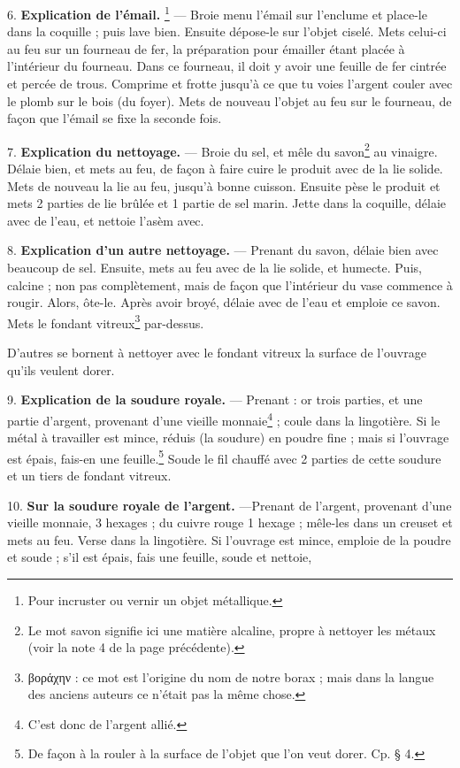\documentclass[a4paper, 11pt, oneside, polutonikogreek, french]{article}
\begin{document}
6. \textbf{Explication de l'émail.} \footnote{Pour incruster ou vernir un objet métallique.} --- Broie menu l'émail sur l'enclume et place-le dans la coquille ; puis lave bien. Ensuite dépose-le sur l'objet ciselé. Mets celui-ci au feu sur un fourneau de fer, la préparation pour émailler étant placée à l'intérieur du fourneau. Dans ce fourneau, il doit y avoir une feuille de fer cintrée et percée de trous. Comprime et frotte jusqu'à ce que tu voies l'argent couler avec le plomb sur le bois (du foyer). Mets de nouveau l'objet au feu sur le fourneau, de façon que l'émail se fixe la seconde fois.

7. \textbf{Explication du nettoyage.} --- Broie du sel, et mêle du savon\footnote{Le mot savon signifie ici une matière alcaline, propre à nettoyer les métaux (voir la note 4 de la page précédente).} au vinaigre. Délaie bien, et mets au feu, de façon à faire cuire le produit avec de la lie solide. Mets de nouveau la lie au feu, jusqu'à bonne cuisson. Ensuite pèse le produit et mets 2 parties de lie brûlée et 1 partie de sel marin. Jette dans la coquille, délaie avec de l'eau, et nettoie l'asèm avec.

8. \textbf{Explication d'un autre nettoyage.} --- Prenant du savon, délaie bien avec beaucoup de sel. Ensuite, mets au feu avec de la lie solide, et humecte. Puis, calcine ; non pas complètement, mais de façon que l'intérieur du vase commence à rougir. Alors, ôte-le. Après avoir broyé, délaie avec de l'eau et emploie ce savon. Mets le fondant vitreux\footnote{βοράχην : ce mot est l'origine du nom de notre borax ; mais dans la langue des anciens auteurs ce n'était pas la même chose.} par-dessus.

D'autres se bornent à nettoyer avec le fondant vitreux la surface de l'ouvrage qu'ils veulent dorer.

9. \textbf{Explication de la soudure royale.} --- Prenant : or trois parties, et une partie d'argent, provenant d'une vieille monnaie\footnote{C'est donc de l'argent allié.} ; coule dans la lingotière. Si le métal à travailler est mince, réduis (la soudure) en poudre fine ; mais si l'ouvrage est épais, fais-en une feuille.\footnote{De façon à la rouler à la surface de l'objet que l'on veut dorer. Cp. § 4.} Soude le fil chauffé avec 2 parties de cette soudure et un tiers de fondant vitreux.

10. \textbf{Sur la soudure royale de l'argent.} ---Prenant de l'argent, provenant d'une vieille monnaie, 3 hexages ; du cuivre rouge 1 hexage ; mêle-les dans un creuset et mets au feu. Verse dans la lingotière. Si l'ouvrage est mince, emploie de la poudre et soude ; s'il est épais, fais une feuille, soude et nettoie,
\end{document}
